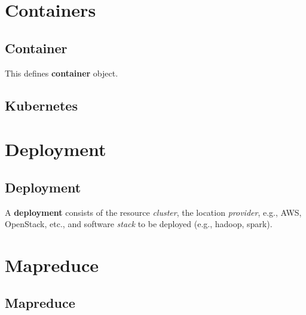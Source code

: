\documentclass[9pt,twocolumn]{styles/osajnl}
\begin{document}


\section{Containers}

\subsection{Container}

This defines \textbf{container} object.


\subsection{Kubernetes}



\section{Deployment}

\subsection{Deployment}

A \textbf{deployment} consists of the resource \- \textit{cluster},
the location \- \textit{provider}, e.g., AWS, OpenStack, etc., and
software \textit{stack} to be deployed (e.g., hadoop, spark).


\section{Mapreduce}

\subsection{Mapreduce}
\end{document}

